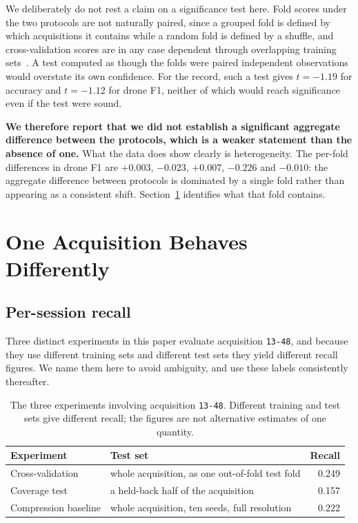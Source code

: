 \documentclass[conference]{IEEEtran}
\begin{document}
We deliberately do not rest a claim on a significance test here. Fold scores
under the two protocols are not naturally paired, since a grouped fold is
defined by which acquisitions it contains while a random fold is defined by a
shuffle, and cross-validation scores are in any case dependent through
overlapping training sets~\cite{dietterich1998,nadeau2003}. A test computed
as though the folds were paired independent observations would overstate its
own confidence. For the record, such a test gives $t=-1.19$ for accuracy and
$t=-1.12$ for drone F1, neither of which would reach significance even if the
test were sound.

\textbf{We therefore report that we did not establish a significant aggregate
difference between the protocols, which is a weaker statement than the
absence of one.} What the data does show clearly is heterogeneity. The
per-fold differences in drone F1 are $+0.003$, $-0.023$, $+0.007$, $-0.226$
and $-0.010$: the aggregate difference between protocols is dominated by a
single fold rather than appearing as a consistent shift.
Section~\ref{sec:regime} identifies what that fold contains.

\section{One Acquisition Behaves Differently}
\label{sec:regime}

\subsection{Per-session recall}

Three distinct experiments in this paper evaluate acquisition
\texttt{13-48}, and because they use different training sets and different
test sets they yield different recall figures. We name them here to avoid
ambiguity, and use these labels consistently thereafter.

\begin{table}[t]
\caption{The three experiments involving acquisition \texttt{13-48}.
Different training and test sets give different recall; the figures are not
alternative estimates of one quantity.}
\label{tab:three}
\centering
\small
\setlength{\tabcolsep}{4pt}
\begin{tabular}{@{}p{}p{}r@{}}
\toprule
Experiment & Test set & Recall \\
\midrule
Cross-validation & whole acquisition, as one out-of-fold test fold & 0.249 \\
Coverage test & a held-back half of the acquisition & 0.157 \\
Compression baseline & whole acquisition, ten seeds, full resolution & 0.222 \\
\bottomrule
\end{tabular}
\end{table}
\end{document}
